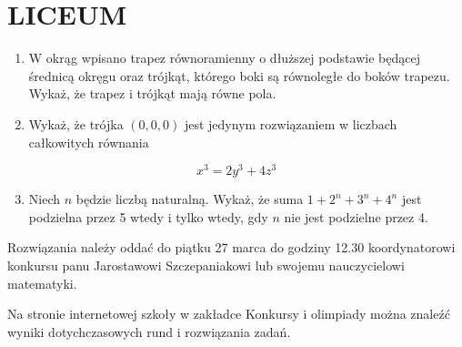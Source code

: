 \documentclass[10pt]{article}
\begin{document}
\section*{LICEUM}
\begin{enumerate}
  \item W okrąg wpisano trapez równoramienny o dłuższej podstawie będącej średnicą okręgu oraz trójkąt, którego boki są równoległe do boków trapezu. Wykaż, że trapez i trójkąt mają równe pola.
  \item Wykaż, że trójka \((0,0,0)\) jest jedynym rozwiązaniem w liczbach całkowitych równania
\end{enumerate}

\[
x^{3}=2 y^{3}+4 z^{3}
\]

\begin{enumerate}
  \setcounter{enumi}{2}
  \item Niech \(n\) będzie liczbą naturalną. Wykaż, że suma \(1+2^{n}+3^{n}+4^{n}\) jest podzielna przez 5 wtedy i tylko wtedy, gdy \(n\) nie jest podzielne przez 4.
\end{enumerate}

Rozwiązania należy oddać do piątku 27 marca do godziny 12.30 koordynatorowi konkursu panu Jarostawowi Szczepaniakowi lub swojemu nauczycielowi matematyki.

Na stronie internetowej szkoły w zakładce Konkursy i olimpiady można znaleźć wyniki dotychczasowych rund i rozwiązania zadań.
\end{document}
